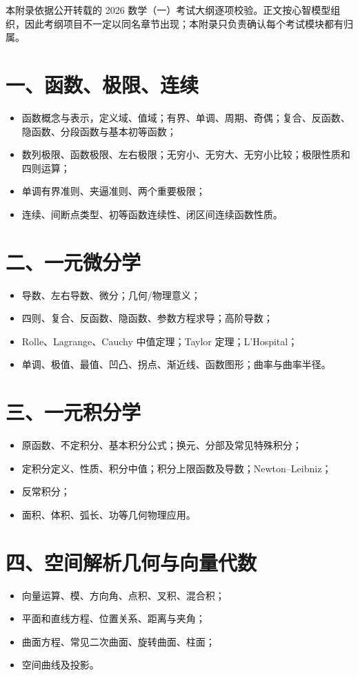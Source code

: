 \documentclass[11pt,a4paper,openany]{ctexbook}
\begin{document}
本附录依据公开转载的 2026 数学（一）考试大纲逐项校验。正文按心智模型组织，因此考纲项目不一定以同名章节出现；本附录只负责确认每个考试模块都有归属。

\section*{一、函数、极限、连续}
\begin{itemize}
  \item 函数概念与表示，定义域、值域；有界、单调、周期、奇偶；复合、反函数、隐函数、分段函数与基本初等函数；
  \item 数列极限、函数极限、左右极限；无穷小、无穷大、无穷小比较；极限性质和四则运算；
  \item 单调有界准则、夹逼准则、两个重要极限；
  \item 连续、间断点类型、初等函数连续性、闭区间连续函数性质。
\end{itemize}

\section*{二、一元微分学}
\begin{itemize}
  \item 导数、左右导数、微分；几何/物理意义；
  \item 四则、复合、反函数、隐函数、参数方程求导；高阶导数；
  \item Rolle、Lagrange、Cauchy 中值定理；Taylor 定理；L'Hospital；
  \item 单调、极值、最值、凹凸、拐点、渐近线、函数图形；曲率与曲率半径。
\end{itemize}

\section*{三、一元积分学}
\begin{itemize}
  \item 原函数、不定积分、基本积分公式；换元、分部及常见特殊积分；
  \item 定积分定义、性质、积分中值；积分上限函数及导数；Newton--Leibniz；
  \item 反常积分；
  \item 面积、体积、弧长、功等几何物理应用。
\end{itemize}

\section*{四、空间解析几何与向量代数}
\begin{itemize}
  \item 向量运算、模、方向角、点积、叉积、混合积；
  \item 平面和直线方程、位置关系、距离与夹角；
  \item 曲面方程、常见二次曲面、旋转曲面、柱面；
  \item 空间曲线及投影。
\end{itemize}
\end{document}
